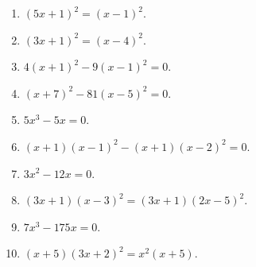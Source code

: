 \documentclass[12 pt]{extarticle}
\theoremstyle{plain}
\begin{document}
\begin{enumerate}
\begin{enumerate}
\item $(5x+1)^2=(x-1)^2$.
\item $(3x+1)^2=(x-4)^2$.
\item $4(x+1)^2-9(x-1)^2=0$.
\item $(x+7)^2-81(x-5)^2=0$.
\item $5x^3-5x=0$.
\item $(x+1)(x-1)^2-(x+1)(x-2)^2=0$.
\item $3x^2-12x=0$. 
\item $(3x+1)(x-3)^2=(3x+1)(2x-5)^2$. 
\item $7x^3-175x=0$. 
\item $(x+5)(3x+2)^2=x^2(x+5)$. 

\end{enumerate}
\end{enumerate}
 	
\end{document}
